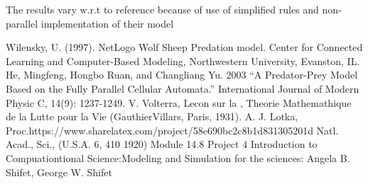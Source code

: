 \documentclass[prl,12pt,citeautoscript,reprint]{revtex4-1}
\begin{document}
The results vary w.r.t to reference\cite{He2003} because of use of simplified rules and non-parallel implementation of their model

\begin{thebibliography}{}
Wilensky, U. (1997). NetLogo Wolf Sheep Predation model. 
Center for Connected Learning and Computer-Based Modeling, Northwestern University, Evanston, IL.
 He, Mingfeng, Hongbo Ruan, and Changliang Yu. 2003 “A Predator-Prey Model
Based on the Fully Parallel Cellular Automata.” International Journal of Modern
Physic C, 14(9): 1237-1249.
 V. Volterra, Lecon sur la , Theorie Mathemathique de la Lutte pour la Vie (GauthierVillars,
Paris, 1931).
 A. J. Lotka, Proc.https://www.sharelatex.com/project/58e690bc2c8b1d831305201d Natl. Acad., Sci., (U.S.A. 6, 410 1920)
 Module 14.8 Project 4 Introduction to Compuationtional Science:Modeling and Simulation for
the sciences: Angela B. Shifet, George W. Shifet
\end{thebibliography}
\end{document}
